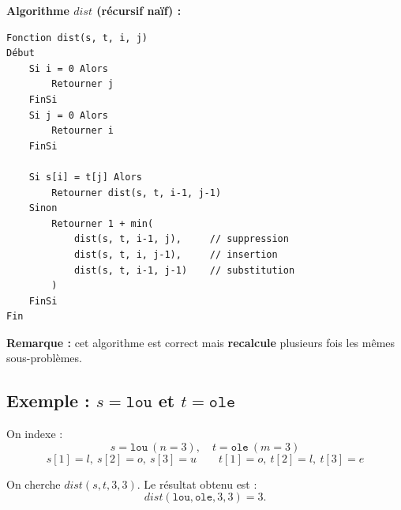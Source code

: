 \documentclass[12pt,a4paper]{article}
\begin{document}
\begin{algorithme}
\textbf{Algorithme $dist$ (récursif naïf) :}
\begin{verbatim}
Fonction dist(s, t, i, j)
Début
    Si i = 0 Alors
        Retourner j
    FinSi
    Si j = 0 Alors
        Retourner i
    FinSi

    Si s[i] = t[j] Alors
        Retourner dist(s, t, i-1, j-1)
    Sinon
        Retourner 1 + min(
            dist(s, t, i-1, j),     // suppression
            dist(s, t, i, j-1),     // insertion
            dist(s, t, i-1, j-1)    // substitution
        )
    FinSi
Fin
\end{verbatim}

\textbf{Remarque :} cet algorithme est correct mais \textcolor{importantrouge}{\textbf{recalcule}} plusieurs fois les mêmes sous-problèmes.
\end{algorithme}

\subsection{Exemple : $s=\texttt{lou}$ et $t=\texttt{ole}$}

\begin{exemple}
On indexe :
\[
s=\texttt{lou}\ (n=3),\quad t=\texttt{ole}\ (m=3)
\]
\[
s[1]=l,\ s[2]=o,\ s[3]=u \qquad t[1]=o,\ t[2]=l,\ t[3]=e
\]

On cherche $dist(s,t,3,3)$. Le résultat obtenu est :
\[
dist(\texttt{lou},\texttt{ole},3,3)=3.
\]
\end{exemple}
\end{document}
